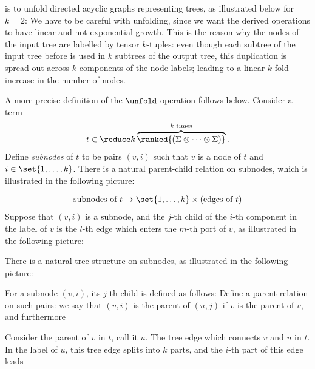 is to unfold directed acyclic graphs representing trees, as illustrated below for $k=2$:
We have to be careful with unfolding, since we want the derived  operations to have linear and not exponential growth. This is the reason why the nodes of the input tree are labelled by tensor $k$-tuples:  even though each subtree of the input tree before is used in  $k$ subtrees of the output tree, this duplication is spread out across $k$ components of the node labels; leading to a linear $k$-fold increase in the number of nodes. 

A more precise definition of the $\unfold$ operation follows below. Consider a term 
\begin{align*}
    t \in \reduce k \overbrace{\ranked{(\Sigma \otimes \cdots \otimes \Sigma)}}^\text{$k$ times}.
\end{align*}
Define \emph{subnodes} of $t$ to be pairs  $(v,i)$ such that $v$ is a node of $t$ and $i \in \set{1,\ldots,k}$. There is a natural parent-child relation on subnodes, which is illustrated in the following picture:



\begin{align*}
    \text{subnodes of $t$} \to \set{1,\ldots,k} \times \text{(edges of $t$)}
\end{align*}
Suppose that $(v,i)$ is a subnode, and the $j$-th child of the $i$-th component in the label of $v$ is the $l$-th edge which enters the $m$-th port of $v$, as illustrated in the following picture:


There is a natural tree structure on subnodes, as illustrated in the following picture:

For a subnode $(v,i)$, its $j$-th child is defined as follows: Define a parent relation on such pairs: we say that $(v,i)$ is the parent of $(u,j)$ if $v$ is the parent of $v$, and furthermore 

Consider the parent of $v$ in $t$, call it $u$. The tree edge which connects $v$ and $u$ in $t$. In the label of $u$, this tree edge splits into $k$ parts, and the $i$-th part of this edge leads 



